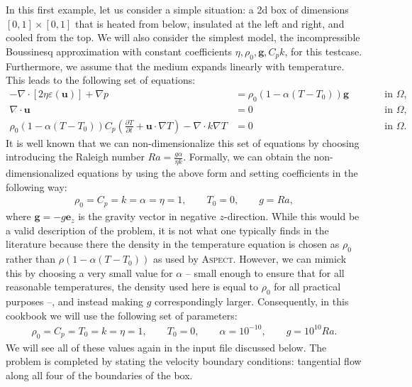 \documentclass{article}
\newcommand{\aspect}{\textsc{Aspect}}
\begin{document}
In this first example, let us consider a simple situation: a 2d box of dimensions
$[0,1]\times [0,1]$ that is heated from below, insulated at the left and right,
and cooled from the top. We will also consider the simplest model, the
incompressible Boussinesq approximation with constant coefficients
$\eta,\rho_0,\mathbf g,C_p k$, for this testcase. Furthermore, we
assume that the medium expands linearly with
temperature. This leads to the following set of equations:
\begin{align}
  -\nabla \cdot \left[2\eta \varepsilon(\mathbf u)
                \right] + \nabla p &=
  \rho_0 (1-\alpha (T-T_0)) \mathbf g
  & \qquad
  & \textrm{in $\Omega$},
  \\
  \nabla \cdot \mathbf u &= 0
  & \qquad
  & \textrm{in $\Omega$},
  \\
  \rho_0 (1-\alpha (T-T_0)) C_p \left(\frac{\partial T}{\partial t} + \mathbf
  u\cdot\nabla T\right) - \nabla\cdot k\nabla T
  &=
  0
  & \qquad
  & \textrm{in $\Omega$}.
\end{align}
It is well known that we can non-dimensionalize this set of equations by
choosing introducing the Raleigh number $Ra=\frac{g\alpha}{\eta k}$. Formally,
we can obtain the non-dimensionalized equations by using the above form and
setting coefficients in the following way:
\begin{align*}
  \rho_0=C_p=k=\alpha=\eta=1, \qquad T_0=0, \qquad g=Ra,
\end{align*}
where $\mathbf g=-g \mathbf e_z$ is the gravity vector in negative
$z$-direction. While this would be a valid description of the problem, it is not
what one typically finds in the literature because there the density in the
temperature equation is chosen as $\rho_0$ rather than $\rho(1-\alpha(T-T_0))$
as used by \aspect{}. However, we can mimick this by choosing a very small value
for $\alpha$ -- small enough to ensure that for all reasonable temperatures,
the density used here is equal to $\rho_0$ for all practical purposes --, and
instead making $g$ correspondingly larger.
Consequently, in this cookbook we will use the following set of parameters:
\begin{align*}
  \rho_0=C_p=T_0=k=\eta=1, \qquad T_0=0, \qquad \alpha=10^{-10}, \qquad
  g=10^{10} Ra.
\end{align*}
We will see all of these values again in the input file discussed below.
The problem is completed by stating the velocity boundary conditions: tangential
flow along all four of the boundaries of the box.
\end{document}
